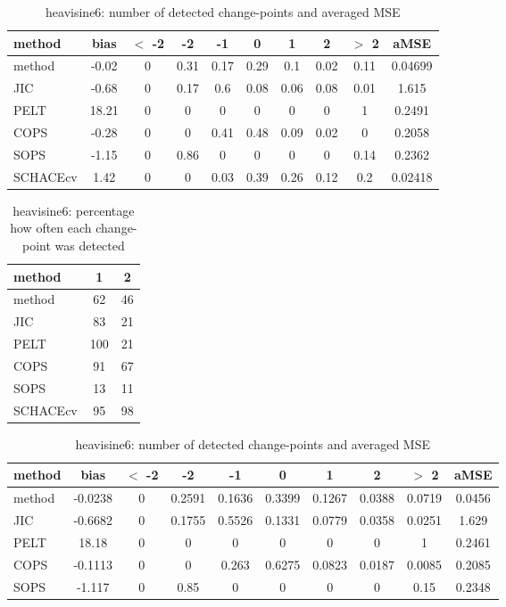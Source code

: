 \begin{table}[ht]
\centering
\begin{tabular}{l|c|ccccccc|c}
  \hline
method & bias & $<$ -2 & -2 & -1 & 0 & 1 & 2 & $>$ 2 & aMSE \\ 
  \hline
method & -0.02 &     0 &  0.31 &  0.17 &  0.29 &   0.1 &  0.02 &  0.11 & 0.04699 \\ 
  JIC & -0.68 &     0 &  0.17 &   0.6 &  0.08 &  0.06 &  0.08 &  0.01 & 1.615 \\ 
  PELT & 18.21 &     0 &     0 &     0 &     0 &     0 &     0 &     1 & 0.2491 \\ 
  COPS & -0.28 &     0 &     0 &  0.41 &  0.48 &  0.09 &  0.02 &     0 & 0.2058 \\ 
  SOPS & -1.15 &     0 &  0.86 &     0 &     0 &     0 &     0 &  0.14 & 0.2362 \\ 
  SCHACEcv &  1.42 &     0 &     0 &  0.03 &  0.39 &  0.26 &  0.12 &   0.2 & 0.02418 \\ 
   \hline
\end{tabular}
\caption{heavisine6: number of detected change-points and averaged MSE} 
\label{tab:heavisine6Njumps}
\end{table}
\begin{table}[ht]
\centering
\begin{tabular}{l|cc}
  \hline
method & 1 & 2 \\ 
  \hline
method &     62 &     46 \\ 
  JIC &     83 &     21 \\ 
  PELT &    100 &     21 \\ 
  COPS &     91 &     67 \\ 
  SOPS &     13 &     11 \\ 
  SCHACEcv &     95 &     98 \\ 
   \hline
\end{tabular}
\caption{heavisine6: percentage how often each change-point was detected} 
\label{tab:heavisine6Detections}
\end{table}
\begin{table}[ht]
\centering
\begin{tabular}{l|c|ccccccc|c}
  \hline
method & bias & $<$ -2 & -2 & -1 & 0 & 1 & 2 & $>$ 2 & aMSE \\ 
  \hline
method & -0.0238 &     0 & 0.2591 & 0.1636 & 0.3399 & 0.1267 & 0.0388 & 0.0719 & 0.0456 \\ 
  JIC & -0.6682 &     0 & 0.1755 & 0.5526 & 0.1331 & 0.0779 & 0.0358 & 0.0251 & 1.629 \\ 
  PELT & 18.18 &     0 &     0 &     0 &     0 &     0 &     0 &     1 & 0.2461 \\ 
  COPS & -0.1113 &     0 &     0 & 0.263 & 0.6275 & 0.0823 & 0.0187 & 0.0085 & 0.2085 \\ 
  SOPS & -1.117 &     0 &  0.85 &     0 &     0 &     0 &     0 &  0.15 & 0.2348 \\ 
   \hline
\end{tabular}
\caption{heavisine6: number of detected change-points and averaged MSE} 
\label{tab:heavisine6Njumps}
\end{table}
